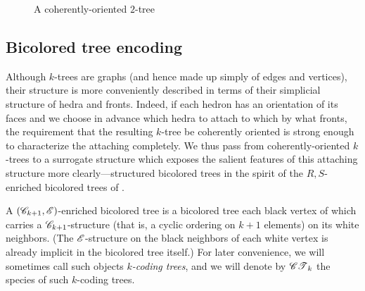 \documentclass[sectionflow,singlespace,twoside,boldmathhdr,draft]{brandiss} %
\numberwithin{section}{chapter}
\numberwithin{figure}{chapter}
\begin{document}
\begin{figure}[htb]
  \centering
  \caption{A coherently-oriented $2$-tree}
  \label{fig:exco2tree}
\end{figure}

\subsection{Bicolored tree encoding}\label{ss:bctree}
Although $k$-trees are graphs (and hence made up simply of edges and vertices), their structure is more conveniently described in terms of their simplicial structure of hedra and fronts.
Indeed, if each hedron has an orientation of its faces and we choose in advance which hedra to attach to which by what fronts, the requirement that the resulting $k$-tree be coherently oriented is strong enough to characterize the attaching completely.
We thus pass from coherently-oriented $k$-trees to a surrogate structure which exposes the salient features of this attaching structure more clearly---structured bicolored trees in the spirit of the $R, S$-enriched bicolored trees of \cite[\S 3.2]{bll:species}.

A $\left( {\mathscr{C}_{k+1}, \mathscr{E}} \right)$-enriched bicolored tree is a bicolored tree each black vertex of which carries a $\mathscr{C}_{k+1}$-structure (that is, a cyclic ordering on $k+1$ elements) on its white neighbors.
(The $\mathscr{E}$-structure on the black neighbors of each white vertex is already implicit in the bicolored tree itself.)
For later convenience, we will sometimes call such objects \emph{$k$-coding trees}, and we will denote by $\mathscr{CT}_{k}$ the species of such $k$-coding trees.
\end{document}
